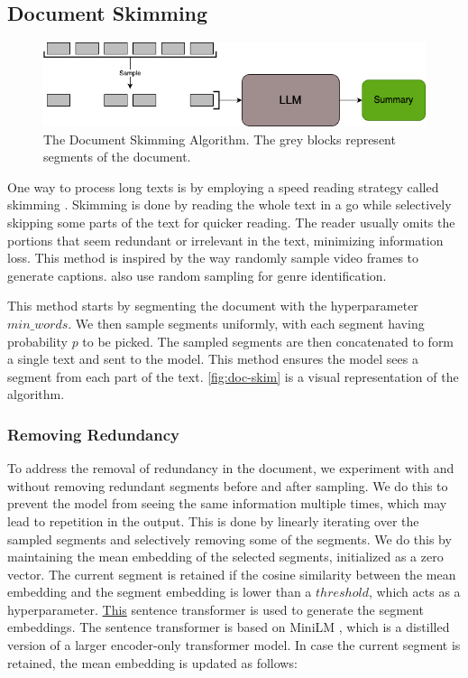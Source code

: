 	\subsection{Document Skimming}
		\label{method:skimming}

		\begin{figure}[!ht]
			\centering
			\includegraphics[width=.8\textwidth]{Images/doc-skim.png}
			\caption{The Document Skimming Algorithm. The grey blocks represent segments of the document.}
			\label{fig:doc-skim}
		\end{figure}

		One way to process long texts is by employing a speed reading strategy called skimming
		\cite{dhillon2020effect}.
		Skimming is done by reading the whole text in a go while selectively skipping some parts of the
		text for quicker reading.
		The reader usually omits the portions that seem redundant or irrelevant in the text, minimizing
		information loss.
		This method is inspired by the way \citet{wang2024videoagent} randomly sample video frames to
		generate captions.
		\citet{worsham-kalita-2018-genre} also use random sampling for genre identification.

		This method starts by segmenting the document with the hyperparameter $min\_words$.
		We then sample segments uniformly, with each segment having probability $p$ to be picked.
		The sampled segments are then concatenated to form a single text and sent to the model.
		This method ensures the model sees a segment from each part of the text.
		\autoref{fig:doc-skim} is a visual representation of the algorithm.

		\subsubsection*{Removing Redundancy}

			To address the removal of redundancy in the document, we experiment with and without removing
			redundant segments before and after sampling.
			We do this to prevent the model from seeing the same information multiple times, which may
			lead to repetition in the output.
			This is done by linearly iterating over the sampled segments and selectively removing some
			of the segments.
			We do this by maintaining the mean embedding of the selected segments, initialized as a zero
			vector.
			The current segment is retained if the cosine similarity between the mean embedding and the
			segment embedding is lower than a $threshold$, which acts as a hyperparameter.
			\href{https://huggingface.co/sentence-transformers/all-MiniLM-L6-v2}{This} sentence transformer
			is used to generate the segment embeddings.
			The sentence transformer is based on MiniLM \cite{wang2020minilm}, which is a distilled version
			of a larger encoder-only transformer model.
			In case the current segment is retained, the mean embedding is updated as follows:

